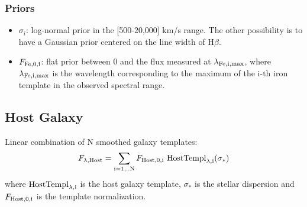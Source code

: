 \documentclass[12pt,letterpaper]{article}
\newcommand{\Hbeta}{\ifmmode {\rm H}\beta \else H$\beta$\fi}
\begin{document}
\subsubsection*{Priors}
\begin{itemize}
    \item {\tt $\sigma_i$}: log-normal prior in the [500-20,000] km/s range. The other possibility is to have a Gaussian prior centered on the line width of \Hbeta.
    \item {\tt $F_{\rm Fe,0,i}$}: flat prior between 0 and the flux measured at $\lambda_{\rm Fe,i,max}$, where $\lambda_{\rm Fe,i,max}$ is the wavelength 
      corresponding to the maximum of the i-th iron template in the observed spectral range.
\end{itemize}

\subsection*{Host Galaxy}
Linear combination of N smoothed galaxy templates:
\begin{equation}
F_{\lambda {\rm{,Host}}} = \sum_{\rm i=1,..N} F_{\rm{Host,0,i}} \  {\rm HostTempl}_{\rm{\lambda,i}}(\sigma_*) 
\end{equation}
where ${\rm HostTempl}_{\rm{\lambda,i}}$ is the host galaxy template,
$\sigma_*$ is the stellar dispersion and $F_{\rm Host,0,i}$ is the
template normalization.\\
\end{document}

